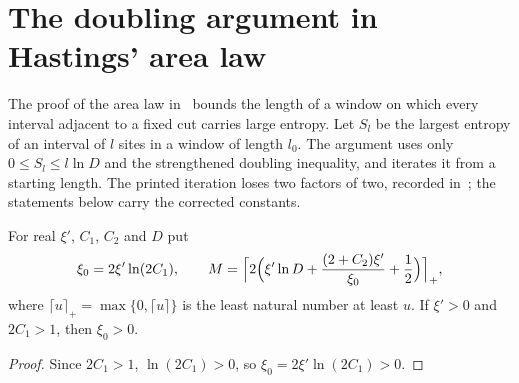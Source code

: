 \section{The doubling argument in Hastings' area law}
\label{sec:hastings_doubling}


The proof of the area law in~\cite{Hastings2007AreaLaw} bounds the length of
a window on which every interval adjacent to a fixed cut carries large
entropy. Let $S_l$ be the largest entropy of an interval of $l$ sites in a
window of length $l_0$. The argument uses only $0\le S_l\le l\ln D$ and the
strengthened doubling inequality, and iterates it from a starting length.
The printed iteration loses two factors of two, recorded
in~\cite{gap:hastings07_doubling_constants}; the statements below carry the
corrected constants.

\begin{definition}
    \label{def:hastings_doubling_constants}
    \leanok
    For real $\xi'$, $C_1$, $C_2$ and $D$ put
    \begin{align*}
        \xi_0=2\xi'\ln(2C_1),
        \qquad
        M=\Bigl\lceil2\Bigl(\xi'\ln D+\frac{(2+C_2)\xi'}{\xi_0}
        +\frac12\Bigr)\Bigr\rceil_+ ,
    \end{align*}
    where $\lceil u\rceil_+=\max\{0,\lceil u\rceil\}$ is the least natural
    number at least $u$.
    If $\xi'>0$ and $2C_1>1$, then $\xi_0>0$.
\end{definition}
\begin{proof}\leanok
    Since $2C_1>1$, $\ln(2C_1)>0$, so $\xi_0=2\xi'\ln(2C_1)>0$.
\end{proof}

